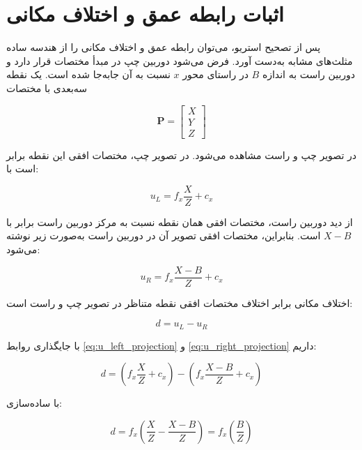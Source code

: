 \section{اثبات رابطه عمق و اختلاف مکانی}

پس از تصحیح استریو، می‌توان رابطه عمق و اختلاف مکانی را از هندسه ساده مثلث‌های مشابه به‌دست آورد. فرض می‌شود دوربین چپ در مبدأ مختصات قرار دارد و دوربین راست به اندازه \(B\) در راستای محور \(x\) نسبت به آن جابه‌جا شده است. یک نقطه سه‌بعدی با مختصات

\begin{equation}
	\mathbf{P} =
	\begin{bmatrix}
		X \\
		Y \\
		Z
	\end{bmatrix}
\end{equation}

در تصویر چپ و راست مشاهده می‌شود. در تصویر چپ، مختصات افقی این نقطه برابر است با:

\begin{equation}
	u_L = f_x\frac{X}{Z} + c_x
	\label{eq:u_left_projection}
\end{equation}

از دید دوربین راست، مختصات افقی همان نقطه نسبت به مرکز دوربین راست برابر با \(X-B\) است. بنابراین، مختصات افقی تصویر آن در دوربین راست به‌صورت زیر نوشته می‌شود:

\begin{equation}
	u_R = f_x\frac{X-B}{Z} + c_x
	\label{eq:u_right_projection}
\end{equation}

اختلاف مکانی برابر اختلاف مختصات افقی نقطه متناظر در تصویر چپ و راست است:

\begin{equation}
	d = u_L - u_R
\end{equation}

با جایگذاری روابط \eqref{eq:u_left_projection} و \eqref{eq:u_right_projection} داریم:

\begin{equation}
	d =
	\left(
	f_x\frac{X}{Z} + c_x
	\right)
	-
	\left(
	f_x\frac{X-B}{Z} + c_x
	\right)
\end{equation}

با ساده‌سازی:

\begin{equation}
	d =
	f_x
	\left(
	\frac{X}{Z}
	-
	\frac{X-B}{Z}
	\right)
	=
	f_x
	\left(
	\frac{B}{Z}
	\right)
\end{equation}

